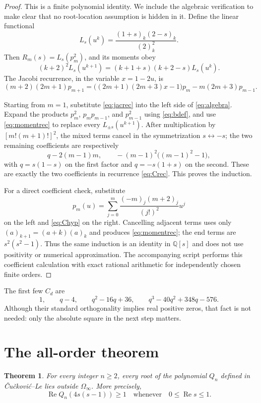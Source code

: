 \documentclass[11pt]{article}
\newtheorem{theorem}{Theorem}
\newcommand{\Om}{\Omega_\infty}
\newcommand{\Ree}{\operatorname{Re}}
\begin{document}
\begin{proof}
This is a finite polynomial identity.  We include the algebraic verification to make clear that no root-location assumption is hidden in it.  Define the linear functional
\[
 L_s(u^k)=\frac{(1+s)_k(2-s)_k}{(2)_k^2}.
\]
Then $R_m(s)=L_s(p_m^2)$, and its moments obey
\begin{equation}\label{eq:momentrec}
 (k+2)^2L_s(u^{k+1})=(k+1+s)(k+2-s)L_s(u^k).
\end{equation}
The Jacobi recurrence, in the variable $x=1-2u$, is
\begin{equation}\label{eq:jacrec}
 (m+2)(2m+1)p_{m+1}
 =\bigl((2m+1)(2m+3)x-1\bigr)p_m
 -m(2m+3)p_{m-1}.
\end{equation}

Starting from $m=1$, substitute \eqref{eq:jacrec} into the left side of
\eqref{eq:algebra}.  Expand the products $p_m^2$, $p_mp_{m-1}$, and
$p_{m-1}^2$ using \eqref{eq:bdef}, and use
\eqref{eq:momentrec} to replace every $L_{\pm s}(u^{k+1})$.  After multiplication by $[m!(m+1)!]^2$, the mixed terms cancel in the symmetrization $s\leftrightarrow-s$; the two remaining coefficients are respectively
\[
 q-2(m-1)m,\qquad -(m-1)^2\bigl((m-1)^2-1\bigr),
 \]
with $q=s(1-s)$ on the first factor and $q=-s(1+s)$ on the second.  These are exactly the two coefficients in recurrence \eqref{eq:Crec}.  This proves the induction.

For a direct coefficient check, substitute
\[
 p_m(u)=\sum_{j=0}^m
 \frac{(-m)_j(m+2)_j}{(j!)^2}u^j
\]
on the left and \eqref{eq:Chyp} on the right.  Cancelling adjacent terms uses only
$(a)_{k+1}=(a+k)(a)_k$ and produces \eqref{eq:momentrec}; the end terms are
$s^2(s^2-1)$.  Thus the same induction is an identity in $\mathbb Q[s]$ and does not use positivity or numerical approximation.  The accompanying script performs this coefficient calculation with exact rational arithmetic for independently chosen finite orders.
\end{proof}

The first few $C_d$ are
\[
 1,\qquad q-4,\qquad q^2-16q+36,
 \qquad q^3-40q^2+348q-576.
\]
Although their standard orthogonality implies real positive zeros, that fact is not needed: only the absolute square in the next step matters.

\section{The all-order theorem}

\begin{theorem}\label{thm:main}
For every integer $n\ge2$, every root of the polynomial $Q_n$ defined in
\v{C}u\v{c}kovi\'c--Le lies outside $\Om$.  More precisely,
\[
 \Ree Q_n(4s(s-1))\ge1
 \quad\text{whenever}\quad 0\le\Ree s\le1.
\]
\end{theorem}
\end{document}
